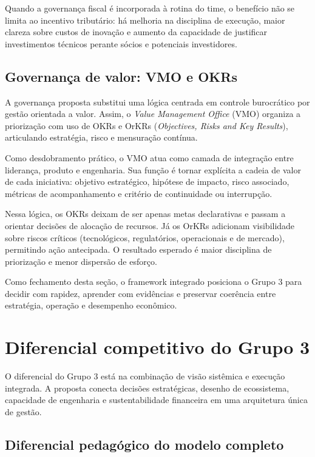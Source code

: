 Quando a governança fiscal é incorporada à rotina do time, o benefício não se limita ao incentivo tributário: há melhoria na disciplina de execução, maior clareza sobre custos de inovação e aumento da capacidade de justificar investimentos técnicos perante sócios e potenciais investidores.

\subsection{Governança de valor: VMO e OKRs}

A governança proposta substitui uma lógica centrada em controle burocrático por gestão orientada a valor. Assim, o \textit{Value Management Office} (VMO) organiza a priorização com uso de OKRs e OrKRs (\textit{Objectives, Risks and Key Results}), articulando estratégia, risco e mensuração contínua.

Como desdobramento prático, o VMO atua como camada de integração entre liderança, produto e engenharia. Sua função é tornar explícita a cadeia de valor de cada iniciativa: objetivo estratégico, hipótese de impacto, risco associado, métricas de acompanhamento e critério de continuidade ou interrupção.

Nessa lógica, os OKRs deixam de ser apenas metas declarativas e passam a orientar decisões de alocação de recursos. Já os OrKRs adicionam visibilidade sobre riscos críticos (tecnológicos, regulatórios, operacionais e de mercado), permitindo ação antecipada. O resultado esperado é maior disciplina de priorização e menor dispersão de esforço.

Como fechamento desta seção, o framework integrado posiciona o Grupo 3 para decidir com rapidez, aprender com evidências e preservar coerência entre estratégia, operação e desempenho econômico.

\section{Diferencial competitivo do Grupo 3}

O diferencial do Grupo 3 está na combinação de visão sistêmica e execução integrada. A proposta conecta decisões estratégicas, desenho de ecossistema, capacidade de engenharia e sustentabilidade financeira em uma arquitetura única de gestão.

\subsection{Diferencial pedagógico do modelo completo}

